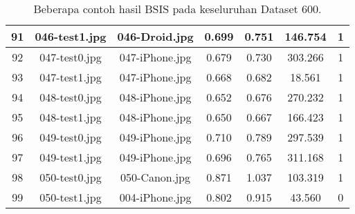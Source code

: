 \begin{table}[H]
\begin{tabular}{|c|c|c|c|c|c|c|}
		\hline
		91  & 046-test1.jpg    & 046-Droid.jpg    & 0.699                 & 0.751                & 146.754                & 1                  \\ 
		\hline
		92  & 047-test0.jpg    & 047-iPhone.jpg   & 0.679                 & 0.730                & 303.266                & 1                  \\ 
		\hline
		93  & 047-test1.jpg    & 047-iPhone.jpg   & 0.668                 & 0.682                & 18.561                 & 1                  \\ 
		\hline
		94  & 048-test0.jpg    & 048-iPhone.jpg   & 0.652                 & 0.676                & 270.232                & 1                  \\ 
		\hline
		95  & 048-test1.jpg    & 048-iPhone.jpg   & 0.650                 & 0.667                & 166.423                & 1                  \\ 
		\hline
		96  & 049-test0.jpg    & 049-iPhone.jpg   & 0.710                 & 0.789                & 297.539                & 1                  \\ 
		\hline
		97  & 049-test1.jpg    & 049-iPhone.jpg   & 0.696                 & 0.765                & 311.168                & 1                  \\ 
		\hline
		98  & 050-test0.jpg    & 050-Canon.jpg    & 0.871                 & 1.037                & 103.319                & 1                  \\ 
		\hline
		99  & 050-test1.jpg    & 004-iPhone.jpg   & 0.802                 & 0.915                & 43.560                 & 0                  \\
		\hline
	\end{tabular}	
	\caption{Beberapa contoh hasil BSIS pada keseluruhan Dataset 600.}
	\label{tab:result_full_600}
\end{table}

